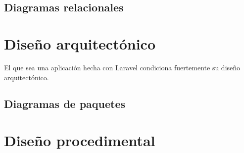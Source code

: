 \subsection{Diagramas relacionales}

\section{Diseño arquitectónico}
El que sea una aplicación hecha con Laravel condiciona fuertemente su diseño arquitectónico.
\subsection{Diagramas de paquetes}
\section{Diseño procedimental}




